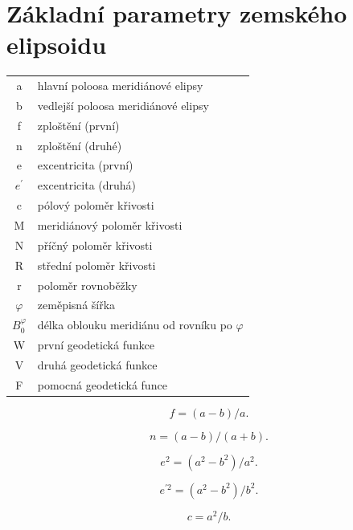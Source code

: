 \section{Základní parametry zemského elipsoidu} \label{appRefEll}

\begin{table}[ht!]
\begin{tabular}{c l}

a & hlavní poloosa meridiánové elipsy \\
b & vedlejší poloosa meridiánové elipsy\\
f & zploštění (první)\\
n & zploštění (druhé)\\
e & excentricita (první)\\
$e^{'}$ & excentricita (druhá)\\
c & pólový poloměr křivosti\\
M & meridiánový poloměr křivosti\\
N & příčný poloměr křivosti\\
R & střední poloměr křivosti\\
r & poloměr rovnoběžky\\
$\varphi$ & zeměpisná šířka\\
$B_{0}^{\varphi}$ & délka oblouku meridiánu od rovníku po $\varphi$ \\
W & první geodetická funkce\\
V & druhá geodetická funkce\\
F & pomocná geodetická funce\\      
\end{tabular}
\end{table}

\begin{equation}
f = (a-b)/a.
\end{equation}

\begin{equation}
n = (a-b)/(a+b).
\end{equation}

\begin{equation}
e^{2} = (a^{2}-b^{2})/a^{2}.
\end{equation}

\begin{equation}
e^{'2} = (a^{2}-b^{2})/b^{2}.
\end{equation}

\begin{equation}
c = a^{2}/b.
\end{equation}

